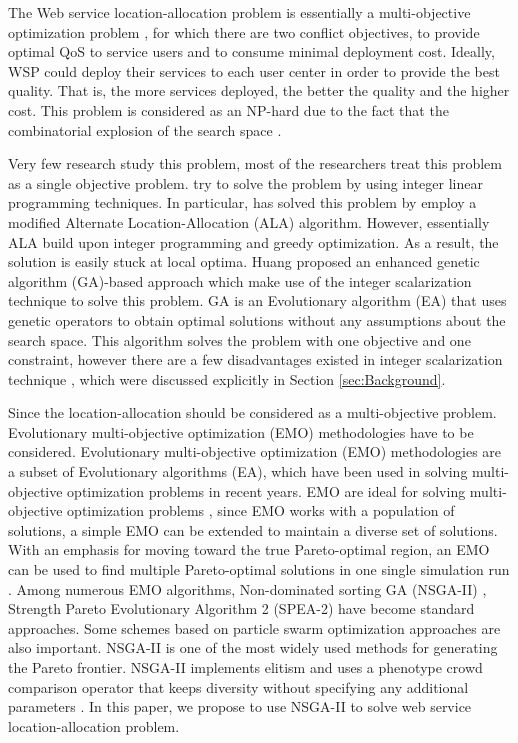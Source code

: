 \documentclass{llncs}
\begin{document}
The Web service location-allocation problem is essentially a multi-objective optimization problem \cite{Multiobjective}, for which there are two conflict objectives, to provide optimal 
QoS to service users and to consume minimal deployment cost.
Ideally, WSP could deploy their services to each user center in order to provide the best quality.
That is, the more services deployed, the better the quality and the higher cost. 
This problem is considered as an NP-hard due to the fact that the combinatorial explosion of the search space \cite{Vanrompay}. 


Very few research study this problem, most of the researchers treat this problem as a single objective problem.
\cite{Aboolian} \cite{Sun} try to solve the problem by using integer linear programming techniques.
In particular, \cite{Sun} has solved this problem by employ a modified Alternate Location-Allocation (ALA) algorithm. 
However, essentially ALA build upon integer programming and greedy optimization. 
As a result, the solution is easily stuck at local optima.
Huang \cite{EnhancedGenetic} proposed an enhanced genetic algorithm (GA)-based approach which make use of the integer scalarization technique to solve this problem.
GA \cite{man1996genetic} is an Evolutionary algorithm (EA) that uses genetic operators to obtain optimal solutions without any assumptions about the search space.
This algorithm solves the problem with one objective and one constraint, however there are a few disadvantages existed in
integer scalarization technique \cite{Multiobjective}, which were discussed explicitly in Section \ref{sec:Background}.

Since the location-allocation should be considered as a multi-objective problem. Evolutionary multi-objective optimization (EMO) methodologies have to be considered.
Evolutionary multi-objective optimization (EMO) methodologies are a subset of Evolutionary algorithms (EA), which have been used in solving multi-objective optimization problems in recent years. 
EMO are ideal for solving multi-objective optimization problems \cite{key:article}, since EMO works with a population of solutions, 
a simple EMO can be extended to maintain a diverse set of solutions.
With an emphasis for moving toward the true Pareto-optimal region, an EMO can be used to find multiple Pareto-optimal solutions in 
one single simulation run \cite{OptimizationElectrical}. Among numerous EMO algorithms,
Non-dominated sorting GA (NSGA-II) \cite{996017}, Strength Pareto Evolutionary Algorithm 2 (SPEA-2) \cite{Deb} have become standard approaches. 
Some schemes based on particle swarm optimization approaches \cite{Elhossini} \cite{Huang} are also important. 
NSGA-II is one of the most widely used methods for generating the Pareto frontier. 
NSGA-II implements elitism and uses a phenotype crowd comparison operator that keeps diversity without specifying any additional parameters \cite{Deb06referencepoint}.
In this paper, we propose to use NSGA-II to solve web service location-allocation problem.
\end{document}
